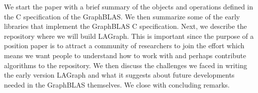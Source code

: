 We start the paper with a brief summary of the objects and operations defined in
the C specification of the GraphBLAS.  We then  summarize some of the 
early libraries that implement the GraphBLAS C specification.  Next, we describe
the repository where we will build LAGraph.  This is important since the
purpose of a position paper is to attract a community of researchers to join the effort
which means we want people to understand how to work with and perhaps contribute 
algorithms to the repository.  We then discuss the challenges we faced in writing the 
early version LAGraph and what it suggests about future developments needed in the
GraphBLAS themselves. We close with concluding remarks.














